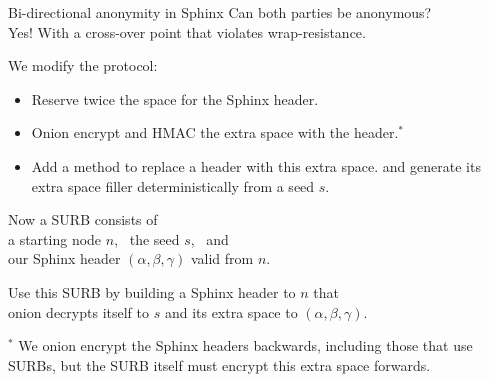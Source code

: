 \documentclass[fleqn,xcolor={usenames,dvipsnames}]{beamer}
\begin{document}
\begin{frame}{Bi-directional anonymity in Sphinx}
Can both parties be anonymous? \\
Yes!  With a cross-over point that violates wrap-resistance.

\medskip
We modify the protocol:
\begin{itemize}
\item Reserve twice the space for the Sphinx header. 
\item Onion encrypt and HMAC the extra space with the header.{\small $^*$}
\item Add a method to replace a header with this extra space. 
 and generate its extra space filler deterministically from a seed $s$. 
\end{itemize}
Now a SURB consists of \\
\hspace*{2pt} a starting node $n$, \ the seed $s$, \ and \\
\hspace*{2pt} our Sphinx header $(\alpha, \beta, \gamma)$ valid from $n$.

\medskip
Use this SURB by building a Sphinx header to $n$ that \\
\hspace*{2pt} onion decrypts itself to $s$ and its extra space  to $(\alpha, \beta, \gamma)$.

\bigskip\bigskip

{\small $^*$ We onion encrypt the Sphinx headers backwards, including those that use SURBs,
but the SURB itself must encrypt this extra space forwards.}

\end{frame}
\end{document}
